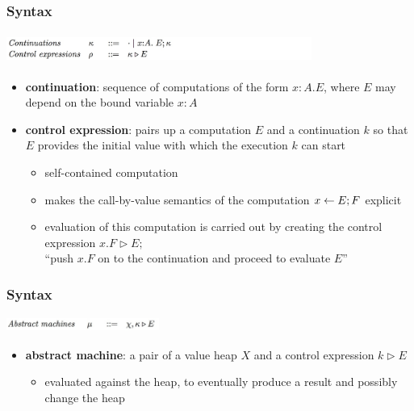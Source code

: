 \documentclass[xcolor=dvipsnames,9pt,hide notes,mathserif]{beamer}
\begin{document}
\begin{frame}
  \frametitle{Syntax}
\begin{center}
    \includegraphics[width=10cm, height=1cm]{inputs/cc}
\end{center}
\begin{itemize}
\item {\bf continuation}: sequence of computations of the form
  $x{:}A. E$, where $E$ may depend on the bound variable $x{:} A$

\item {\bf control expression}: pairs up a computation $E$ and a
  continuation $k$ so that $E$ provides the initial value with which
  the execution $k$ can start 
\begin{itemize}
\item self-contained computation
\item makes the call-by-value semantics of the computation $x
  \leftarrow \do E; F$ explicit
\item evaluation of this computation is carried out by creating the
  control expression $x.F \rhd E;$ \\
``push $x.F$ on to the continuation and proceed to evaluate $E$''
\end{itemize}
\end{itemize}
\end{frame}







\begin{frame}
  \frametitle{Syntax}
\begin{center}
    \includegraphics[width=5cm, height=0.5cm]{inputs/a}
\end{center}
\begin{itemize}
\item {\bf abstract machine}: a pair of a value heap $X$ and a control
  expression $k \rhd E$
\begin{itemize}
\item evaluated against the heap, to eventually produce a result and
  possibly change the heap
\end{itemize}
\end{itemize}
\end{frame}
\end{document}
